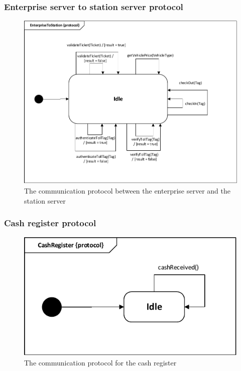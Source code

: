 \subsubsection*{Enterprise server to station server protocol}
\begin{figure}[H]
\centering
\includegraphics[width=0.7\linewidth]{img/behaviour_state_machines/protocol_state_machines/protocol_state_machine_enterprise_server_to_station_server}
\caption{The communication protocol between the enterprise server and the station server}
\label{fig:protocol_state_machine_enterprise_server_to_station_server}
\end{figure}

\subsubsection*{Cash register protocol}
\begin{figure}[H]
\centering
\includegraphics[width=0.7\linewidth]{img/behaviour_state_machines/protocol_state_machines/protocol_state_machine_CR_TLC}
\caption{The communication protocol for the cash register}
\label{fig:protocol_state_machine_CR_TLC}
\end{figure}

